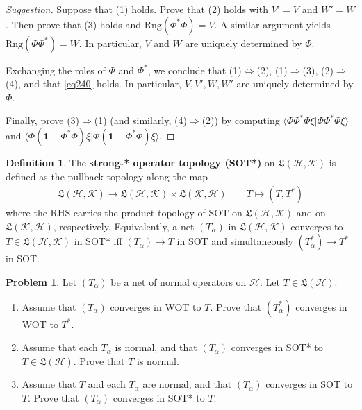 \documentclass[12pt,b5paper,notitlepage]{article}
\theoremstyle{definition}
\newtheorem{df}{Definition}[subsection]
\newtheorem{prob}{\color{red}Problem}[section]
\theoremstyle{plain}
\newcommand{\fk}{\mathfrak}
\newcommand{\idt}{\mathbf{1}}
\newcommand{\bk}[1]{\langle {#1}\rangle}
\newcommand{\Rng}{\mathrm{Rng}}
\newcommand{\MH}{\mathcal H}
\newcommand{\MK}{\mathcal K}
\numberwithin{equation}{section}
\begin{document}
\begin{proof}[Suggestion]
Suppose that (1) holds. Prove that (2) holds with $V'=V$ and $W'=W$. Then prove that (3) holds and $\Rng(\Phi^*\Phi)=V$. A similar argument yields $\Rng(\Phi\Phi^*)=W$. In particular, $V$ and $W$ are uniquely determined by $\Phi$.

Exchanging the roles of $\Phi$ and $\Phi^*$, we conclude that (1)$\Leftrightarrow$(2), (1)$\Rightarrow$(3), (2)$\Rightarrow$(4), and that \eqref{eq240} holds. In particular, $V,V',W,W'$ are uniquely determined by $\Phi$.

Finally, prove (3)$\Rightarrow$(1) (and similarly, (4)$\Rightarrow$(2)) by computing $\bk{\Phi\Phi^*\Phi\xi|\Phi\Phi^*\Phi\xi}$ and $\bk{\Phi(\idt-\Phi^*\Phi)\xi|\Phi(\idt-\Phi^*\Phi)\xi}$.
\end{proof}


\hypertarget{proofread}{}

\begin{df}
The \textbf{strong-* operator topology (SOT*)}   on $\fk L(\MH,\MK)$ is defined as the pullback topology along the map
\begin{align*}
\fk L(\MH,\MK)\rightarrow\fk L(\MH,\MK)\times\fk L(\MK,\MH)\qquad T\mapsto (T,T^*)
\end{align*}
where the RHS carries the product topology of SOT on $\fk L(\MH,\MK)$ and on $\fk L(\MK,\MH)$, respectively. Equivalently, a net $(T_\alpha)$ in $\fk L(\MH,\MK)$ converges to $T\in\fk L(\MH,\MK)$ in SOT* iff $(T_\alpha)\rightarrow T$ in SOT and simultaneously $(T_\alpha^*)\rightarrow T^*$ in SOT.
\end{df}




\begin{prob}\label{lb337}
Let $(T_\alpha)$ be a net of normal operators on $\MH$. Let $T\in\fk L(\MH)$. 
\begin{enumerate}
\item Assume that $(T_\alpha)$ converges in WOT to $T$. Prove that $(T_\alpha^*)$ converges in WOT to $T^*$.
\item Assume that each $T_\alpha$ is normal, and that $(T_\alpha)$ converges in SOT* to $T\in\fk L(\MH)$. Prove that $T$ is normal.
\item Assume that $T$ and each $T_\alpha$ are normal, and that $(T_\alpha)$ converges in SOT to $T$. Prove that $(T_\alpha)$ converges in SOT* to $T$.
\end{enumerate}
\end{prob}
\end{document}
